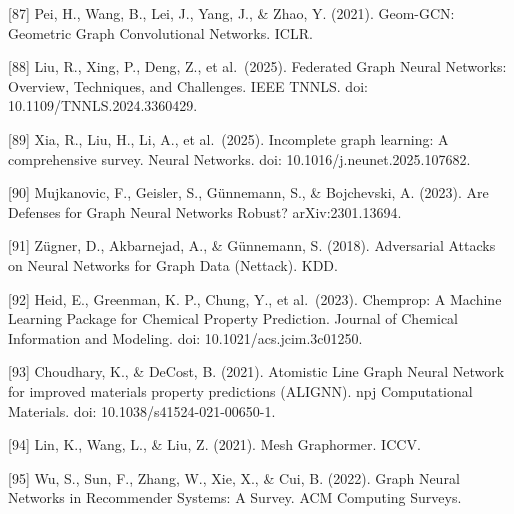 {[}87{]} Pei, H., Wang, B., Lei, J., Yang, J., \& Zhao, Y. (2021). Geom-GCN: Geometric Graph Convolutional Networks. ICLR.

{[}88{]} Liu, R., Xing, P., Deng, Z., et al.~(2025). Federated Graph Neural Networks: Overview, Techniques, and Challenges. IEEE TNNLS. doi: 10.1109/TNNLS.2024.3360429.

{[}89{]} Xia, R., Liu, H., Li, A., et al.~(2025). Incomplete graph learning: A comprehensive survey. Neural Networks. doi: 10.1016/j.neunet.2025.107682.

{[}90{]} Mujkanovic, F., Geisler, S., Günnemann, S., \& Bojchevski, A. (2023). Are Defenses for Graph Neural Networks Robust? arXiv:2301.13694.

{[}91{]} Zügner, D., Akbarnejad, A., \& Günnemann, S. (2018). Adversarial Attacks on Neural Networks for Graph Data (Nettack). KDD.

{[}92{]} Heid, E., Greenman, K. P., Chung, Y., et al.~(2023). Chemprop: A Machine Learning Package for Chemical Property Prediction. Journal of Chemical Information and Modeling. doi: 10.1021/acs.jcim.3c01250.

{[}93{]} Choudhary, K., \& DeCost, B. (2021). Atomistic Line Graph Neural Network for improved materials property predictions (ALIGNN). npj Computational Materials. doi: 10.1038/s41524-021-00650-1.

{[}94{]} Lin, K., Wang, L., \& Liu, Z. (2021). Mesh Graphormer. ICCV.

{[}95{]} Wu, S., Sun, F., Zhang, W., Xie, X., \& Cui, B. (2022). Graph Neural Networks in Recommender Systems: A Survey. ACM Computing Surveys.
